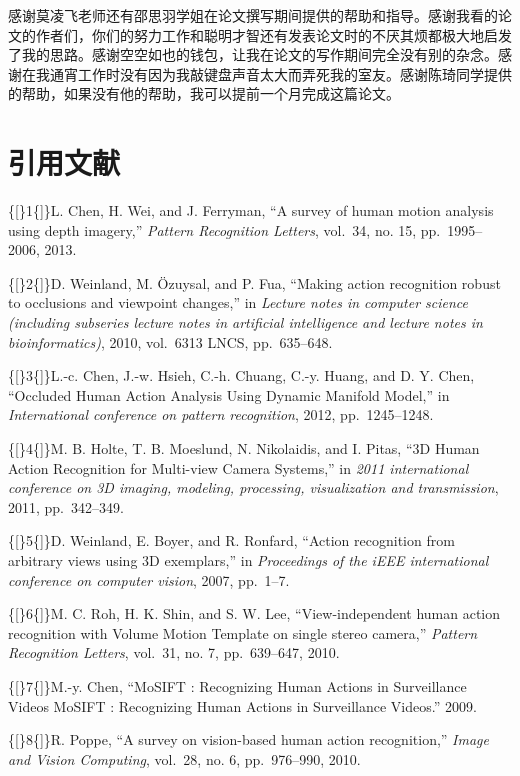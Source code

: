 感谢莫凌飞老师还有邵思羽学姐在论文撰写期间提供的帮助和指导。感谢我看的论文的作者们，你们的努力工作和聪明才智还有发表论文时的不厌其烦都极大地启发了我的思路。感谢空空如也的钱包，让我在论文的写作期间完全没有别的杂念。感谢在我通宵工作时没有因为我敲键盘声音太大而弄死我的室友。感谢陈琦同学提供的帮助，如果没有他的帮助，我可以提前一个月完成这篇论文。

\section*{引用文献}\label{ux5f15ux7528ux6587ux732e}

\{{[}\}1\{{]}\}L. Chen, H. Wei, and J. Ferryman, ``A survey of human
motion analysis using depth imagery,''
\emph{Pattern Recognition Letters}, vol.~34, no. 15, pp.~1995--2006,
2013.

\{{[}\}2\{{]}\}D. Weinland, M. Özuysal, and P. Fua, ``Making action
recognition robust to occlusions and viewpoint changes,'' in
\emph{Lecture notes in
computer science (including subseries lecture notes in artificial
intelligence and lecture notes in bioinformatics)}, 2010, vol.~6313
LNCS, pp.~635--648.

\{{[}\}3\{{]}\}L.-c. Chen, J.-w. Hsieh, C.-h. Chuang, C.-y. Huang, and
D. Y. Chen, ``Occluded Human Action Analysis Using Dynamic Manifold
Model,'' in \emph{International conference on pattern recognition},
2012, pp.~1245--1248.

\{{[}\}4\{{]}\}M. B. Holte, T. B. Moeslund, N. Nikolaidis, and I. Pitas,
``3D Human Action Recognition for Multi-view Camera Systems,'' in
\emph{2011
international conference on 3D imaging, modeling, processing,
visualization and transmission}, 2011, pp.~342--349.

\{{[}\}5\{{]}\}D. Weinland, E. Boyer, and R. Ronfard, ``Action
recognition from arbitrary views using 3D exemplars,'' in
\emph{Proceedings of the iEEE
international conference on computer vision}, 2007, pp.~1--7.

\{{[}\}6\{{]}\}M. C. Roh, H. K. Shin, and S. W. Lee, ``View-independent
human action recognition with Volume Motion Template on single stereo
camera,'' \emph{Pattern Recognition Letters}, vol.~31, no. 7,
pp.~639--647, 2010.

\{{[}\}7\{{]}\}M.-y. Chen, ``MoSIFT : Recognizing Human Actions in
Surveillance Videos MoSIFT : Recognizing Human Actions in Surveillance
Videos.'' 2009.

\{{[}\}8\{{]}\}R. Poppe, ``A survey on vision-based human action
recognition,'' \emph{Image and Vision Computing}, vol.~28, no. 6,
pp.~976--990, 2010.

